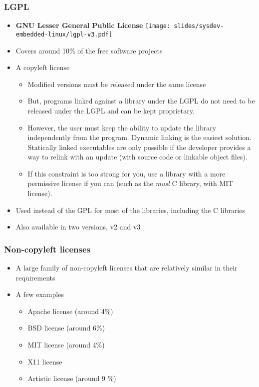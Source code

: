 \begin{frame}
  \frametitle{LGPL}
  \begin{itemize}
  \item {\bf GNU Lesser General Public License}
    \hfill \texttt{[image: slides/sysdev-embedded-linux/lgpl-v3.pdf]}
  \item Covers around 10\% of the free software projects
  \item A copyleft license
    \begin{itemize}
    \item Modified versions must be released under the same license
    \item But, programs linked against a library under the LGPL do not
      need to be released under the LGPL and can be kept proprietary.
    \item However, the user must keep the ability to update the
      library independently from the program. Dynamic linking is the
      easiest solution. Statically linked executables are only possible
      if the developer provides a way to relink with an update
      (with source code or linkable object files).
    \item If this constraint is too strong for you, use a library
      with a more permissive license if you can (such as the {\em musl}
      C library, with MIT license).
    \end{itemize}
  \item Used instead of the GPL for most of the libraries, including
    the C libraries
  \item Also available in two versions, v2 and v3
  \end{itemize}
\end{frame}

\begin{frame}
  \frametitle{Non-copyleft licenses}
  \begin{itemize}
  \item A large family of non-copyleft licenses that are relatively
    similar in their requirements
  \item A few examples
    \begin{itemize}
    \item Apache license (around 4\%)
    \item BSD license (around 6\%)
    \item MIT license (around 4\%)
    \item X11 license
    \item Artistic license (around 9 \%)
    \end{itemize}
  \end{itemize}
\end{frame}

